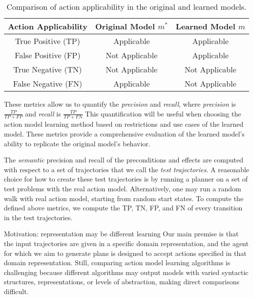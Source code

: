 \begin{table}[h]
    \centering
    \begin{tabular}{|c|c|c|}
        \hline
        \textbf{Action Applicability} & \textbf{Original Model \( m^* \)} & \textbf{Learned Model \( m \)} \\
        \hline
        True Positive (TP) & Applicable & Applicable \\
        False Positive (FP) & Not Applicable & Applicable \\
        True Negative (TN) & Not Applicable & Not Applicable \\
        False Negative (FN) & Applicable & Not Applicable \\
        \hline
    \end{tabular}
    \caption{Comparison of action applicability in the original and learned models.}
    \label{tab:action-model-comparison}
\end{table}
These metrics allow us to quantify the \emph{precision} and \emph{recall}, where \emph{precision} is $\frac{TP}{TP+FP}$ 
and \emph{recall} is $\frac{TP}{TP+FN}$ This quantification will be useful when choosing the action model learning method based on restrictions and use cases of the learned model. These metrics provide a comprehensive evaluation of the learned model's ability to replicate the original model's behavior.

The \emph{semantic} precision and recall of the preconditions and effects are computed with respect to a set of trajectories that we call the \emph{test trajectories}. 
A reasonable choice for how to create these test trajectories is by running a planner on a set of test problems with the real action model. Alternatively, one may run a random walk with real action model, starting from random start states. 
To compute the defined above metrics, we compute the TP, TN, FP, and FN of every transition in the test trajectories. 










 Motivation: representation may be different learning
Our main premise is that the input trajectories are given in a specific domain representation, and the agent for which we aim to generate plans is designed to accept actions specified in that domain representation. 
Still, comparing action model learning algorithms is challenging because different algorithms may output models with varied syntactic structures, representations, or levels of abstraction, making direct comparisons difficult. 

